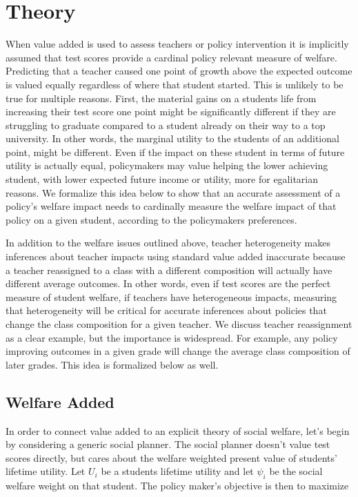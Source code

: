 \documentclass{article}
\theoremstyle{definition}
\theoremstyle{definition}
\theoremstyle{definition}
\theoremstyle{definition}
\begin{document}
\section{Theory}
When value added is used to assess teachers or policy intervention it is implicitly assumed that test scores provide a cardinal policy relevant measure of welfare. Predicting that a teacher caused one point of growth above the expected outcome is valued equally regardless of where that student started. This is unlikely to be true for multiple reasons. First, the material gains on a students life from increasing their test score one point might be significantly different if they are struggling to graduate compared to a student already on their way to a top university. In other words, the marginal utility to the students of an additional point, might be different. Even if the impact on these student in terms of future utility is actually equal, policymakers may value helping the lower achieving student, with lower expected future income or utility, more for egalitarian reasons. We formalize this idea below to show that an accurate assessment of a policy's welfare impact needs to cardinally measure the welfare impact of that policy on a given student, according to the policymakers preferences.

In addition to the welfare issues outlined above, teacher heterogeneity makes inferences about teacher impacts using standard value added inaccurate because a teacher reassigned to a class with a different composition will actually have different average outcomes. In other words, even if test scores are the perfect measure of student welfare, if teachers have heterogeneous impacts, measuring that heterogeneity will be critical for accurate inferences about policies that change the class composition for a given teacher. We discuss teacher reassignment as a clear example, but the importance is widespread. For example, any policy improving outcomes in a given grade will change the average class composition of later grades. This idea is formalized below as well. 
    
    \subsection{Welfare Added }
    
    In order to connect value added to an explicit theory of social welfare, let's begin by considering a generic social planner. The social planner doesn't value test scores directly, but cares about the welfare weighted present value of students' lifetime utility. Let $U_i$ be a students lifetime utility and let $\psi_i$ be the social welfare weight on that student. The policy maker's objective is then to maximize
    
\end{document}

